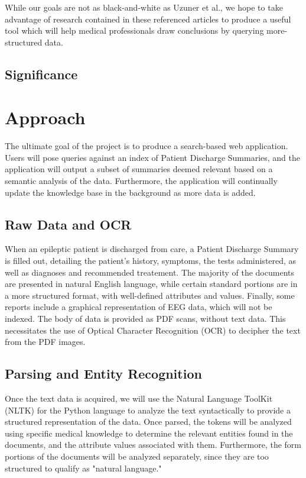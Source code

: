 \documentclass[12pt]{article}
\begin{document}
While our goals are not as black-and-white as Uzuner et al., we hope to take advantage of
research contained in these referenced articles to produce a useful tool which will
help medical professionals draw conclusions by querying more-structured data.

\subsection{Significance}


\section{Approach}
The ultimate goal of the project is to produce a search-based web application.
Users will pose queries against an index of Patient Discharge Summaries, and the
application will output a subset of summaries deemed relevant based on a semantic
analysis of the data. Furthermore, the application will continually update the
knowledge base in the background as more data is added.

\subsection{Raw Data and OCR}
When an epileptic patient is discharged from care, a Patient Discharge Summary is
filled out, detailing the patient's history, symptoms, the tests administered, as
well as diagnoses and recommended treatement. The majority of the documents are
presented in natural English language, while certain standard portions are in a
more structured format, with well-defined attributes and values. Finally, some
reports include a graphical representation of EEG data, which will not be indexed.
The body of data is provided as PDF scans, without text data. This necessitates the use
of Optical Character Recognition (OCR) to decipher the text from the PDF images.

\subsection{Parsing and Entity Recognition}
Once the text data is acquired, we will use the Natural Language ToolKit (NLTK)
for the Python language to analyze the text syntactically to provide a structured
representation of the data. Once parsed, the tokens will be analyzed using specific
medical knowledge to determine the relevant entities found in the documents, and the
attribute values associated with them. Furthermore, the form portions of the documents
will be analyzed separately, since they are too structured to qualify as "natural
language."
\end{document}
